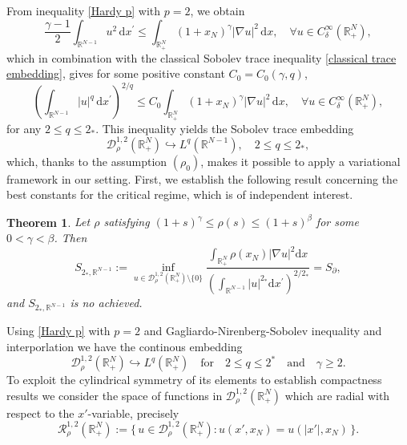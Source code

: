 \documentclass[12pt,reqno]{amsart}
\newtheorem{theorem}{Theorem}[section]
\begin{document}
From inequality \eqref{Hardy p} with $p=2$, we obtain
\begin{equation}\label{Hardy}
			\frac{\gamma-1}{2} \int_{\mathds{R}^{N-1}}u^2\, \mathrm{d}  x^\prime
			\leq \int_{\mathds{R}_{+}^N}(1+x_N)^\gamma |\nabla u|^2 \, \mathrm{d} x, \quad \forall u \in 	C^\infty_\delta(\mathds{R}^N_+),
            \end{equation}
which in combination with the classical Sobolev trace inequality \eqref{classical trace embedding}, gives for some positive constant $C_0=C_0(\gamma,q)$,
\begin{equation}\label{Hardy-L}
			\left( \int_{\mathds{R}^{N-1}}|u|^q\, \mathrm{d}  x^\prime \right)^{2/q}
			\leq C_0 \int_{\mathds{R}_{+}^N}(1+x_N)^\gamma |\nabla u|^2 \, \mathrm{d} x, \quad \forall u \in 	C^\infty_\delta(\mathds{R}^N_+),
            \end{equation}
for any $ 2 \leq q \leq 2_*$. This inequality yields the Sobolev trace embedding 
\begin{equation*}
 \mathcal{D}^{1,2}_\rho(\mathds{R}^N_+) \hookrightarrow L^q(\mathds{R}^{N-1}),   \quad 2 \leq q \leq 2_*,
\end{equation*}
which, thanks to the assumption $(\rho_0)$, makes it possible to apply a variational framework in our setting. First, we establish the following result concerning the best constants for the critical regime, which is of independent interest.
\begin{theorem}\label{best constant} Let $\rho$ satisfying $(1+s)^\gamma\leq \rho(s)\leq (1+s)^\beta$ for some $0<\gamma<\beta$. Then
 \begin{equation*}\label{rho trace best constant}
   S_{2_\ast,\mathds{R}^{N-1}}:= \inf_{u \in \mathcal{D}^{1,2}_\rho(\mathds{R}^N_+)\setminus\{0\}}\frac{\int_{\mathds{R}^N_+}\rho(x_N)|\nabla u|^2\mathrm{d}x}{\left(\int_{\mathds{R}^{N-1}}|u|^{2_\ast}\mathrm{d}x^\prime\right)^{2/2_\ast}}=S_{\partial},
\end{equation*}
and $S_{2_\ast,\mathds{R}^{N-1}}$ is no achieved.
\end{theorem}

Using \eqref{Hardy p} with $p=2$ and Gagliardo-Nirenberg-Sobolev inequality and interporlation we have the continous embedding 
\begin{equation*}
   \mathcal{D}^{1,2}_\rho(\mathds{R}^N_+) \hookrightarrow L^q(\mathds{R}_+^{N}) \quad  \text{for} \quad 2 \leq q \leq 2^* \quad \text{and}  \quad \gamma \geq 2.
\end{equation*}
To exploit the cylindrical symmetry of its elements to establish compactness results we consider the space of functions in $\mathcal{D}^{1,2}_\rho(\mathds{R}^N_+)$ 
which are radial with respect to the $x'$-variable, precisely
\begin{equation}\label{R space}
    \mathcal{R}^{1,2}_\rho(\mathds{R}^N_+)
    := \Big\{\,u \in \mathcal{D}^{1,2}_\rho(\mathds{R}^N_+) : 
    u(x',x_N) = u(|x'|,x_N)\,\Big\}.
\end{equation}
\end{document}
